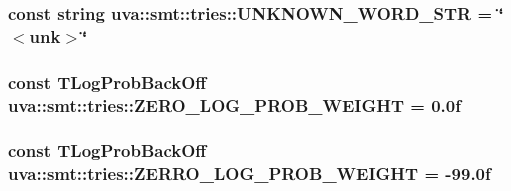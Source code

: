 \subsubsection[{U\+N\+K\+N\+O\+W\+N\+\_\+\+W\+O\+R\+D\+\_\+\+S\+T\+R}]{\setlength{\rightskip}{0pt plus 5cm}const string uva\+::smt\+::tries\+::\+U\+N\+K\+N\+O\+W\+N\+\_\+\+W\+O\+R\+D\+\_\+\+S\+T\+R = \char`\"{}$<$unk$>$\char`\"{}}\label{namespaceuva_1_1smt_1_1tries_aadd51d0ad0007db1d97769719dda1ff0}
\hypertarget{namespaceuva_1_1smt_1_1tries_a60f325085f4d50c378efc2809a6fecc0}{}
\subsubsection[{Z\+E\+R\+O\+\_\+\+L\+O\+G\+\_\+\+P\+R\+O\+B\+\_\+\+W\+E\+I\+G\+H\+T}]{\setlength{\rightskip}{0pt plus 5cm}const {\bf T\+Log\+Prob\+Back\+Off} uva\+::smt\+::tries\+::\+Z\+E\+R\+O\+\_\+\+L\+O\+G\+\_\+\+P\+R\+O\+B\+\_\+\+W\+E\+I\+G\+H\+T = 0.\+0f}\label{namespaceuva_1_1smt_1_1tries_a60f325085f4d50c378efc2809a6fecc0}
\hypertarget{namespaceuva_1_1smt_1_1tries_a9592d33e326894227ec9d9c0a443aac6}{}
\subsubsection[{Z\+E\+R\+R\+O\+\_\+\+L\+O\+G\+\_\+\+P\+R\+O\+B\+\_\+\+W\+E\+I\+G\+H\+T}]{\setlength{\rightskip}{0pt plus 5cm}const {\bf T\+Log\+Prob\+Back\+Off} uva\+::smt\+::tries\+::\+Z\+E\+R\+R\+O\+\_\+\+L\+O\+G\+\_\+\+P\+R\+O\+B\+\_\+\+W\+E\+I\+G\+H\+T = -\/99.\+0f}\label{namespaceuva_1_1smt_1_1tries_a9592d33e326894227ec9d9c0a443aac6}
